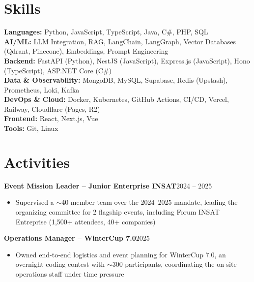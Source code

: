 \documentclass[10pt,a4paper]{article}
\newcommand{\entry}[2]{\vspace{1pt}\noindent\textbf{#1}\hfill{\color{muted}#2}\par}
\begin{document}
\section{Skills}
\textbf{Languages:} Python, JavaScript, TypeScript, Java, C\#, PHP, SQL\\
\textbf{AI/ML:} LLM Integration, RAG, LangChain, LangGraph, Vector Databases (Qdrant, Pinecone), Embeddings, Prompt Engineering\\
\textbf{Backend:} FastAPI (Python), NestJS (JavaScript), Express.js (JavaScript), Hono (TypeScript), ASP.NET Core (C\#)\\
\textbf{Data \& Observability:} MongoDB, MySQL, Supabase, Redis (Upstash), Prometheus, Loki, Kafka\\
\textbf{DevOps \& Cloud:} Docker, Kubernetes, GitHub Actions, CI/CD, Vercel, Railway, Cloudflare (Pages, R2)\\
\textbf{Frontend:} React, Next.js, Vue\\
\textbf{Tools:} Git, Linux

\section{Activities}
\entry{Event Mission Leader -- Junior Enterprise INSAT}{2024 -- 2025}
\begin{itemize}
  \item Supervised a $\sim$40-member team over the 2024--2025 mandate, leading the organizing committee for 2 flagship events, including Forum INSAT Entreprise (1,500+ attendees, 40+ companies)
\end{itemize}
\entry{Operations Manager -- WinterCup 7.0}{2025}
\begin{itemize}
  \item Owned end-to-end logistics and event planning for WinterCup 7.0, an overnight coding contest with $\sim$300 participants, coordinating the on-site operations staff under time pressure
\end{itemize}
\end{document}
